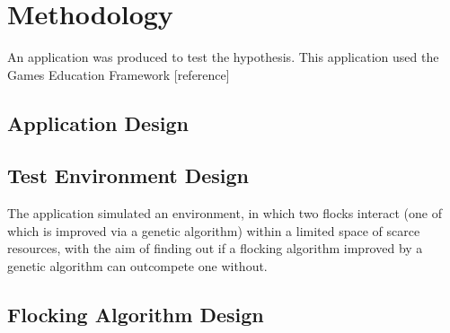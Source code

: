 
\section{Methodology}
An application was produced to test the hypothesis. This application used the Games Education Framework [reference] 

\subsection{Application Design}


\subsection{Test Environment Design}
The application simulated an environment, in which two flocks interact (one of which is improved via a genetic algorithm) within a limited space of scarce resources, with the aim of finding out if a flocking algorithm improved by a genetic algorithm can outcompete one without.

\subsection{Flocking Algorithm Design}

